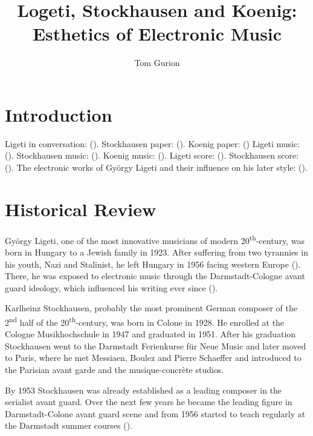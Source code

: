 \documentclass[a4paper,11pt]{article}
\title{Logeti, Stockhausen and Koenig:\\Esthetics of Electronic Music}
\author{Tom Gurion}
\begin{document}
\maketitle
\tableofcontents

\section{Introduction}
\label{sec:introduction}

Ligeti in conversation: (\cite{varnai}).
Stockhausen paper: (\cite{stockhausen}).
Koenig paper: (\cite{koenig})
Ligeti music: (\cite{rami_music}).
Stockhausen music: (\cite{gesang_music}).
Koenig music: (\cite{todo_music}).
Ligeti score: (\cite{rami}).
Stockhausen score: (\cite{gesang}).
The electronic works of Gy{\"o}rgy Ligeti and their influence on his later style: (\cite{levy2006}).

\section{Historical Review}
\label{sec:historical_Review}

Gy{\"o}rgy Ligeti, one of the most innovative musicians of modern 20\textsuperscript{th}-century, was born in Hungary to a Jewish family in 1923.
After suffering from two tyrannies in his youth, Nazi and Stalinist, he left Hungary in 1956 facing western Europe (\cite{ligeti_grove}).
There, he was exposed to electronic music through the Darmstadt-Cologne avant guard ideology, which influenced his writing ever since (\cite[p. TODO]{levy2006}).

Karlheinz Stockhausen, probably the most prominent German composer of the 2\textsuperscript{nd} half of the 20\textsuperscript{th}-century, was born in Colone in 1928.
He enrolled at the Cologne Musikhochschule in 1947 and graduated in 1951.
After his graduation Stockhausen went to the Darmstadt Ferienkurse f{\"u}r Neue Music and later moved to Paris, where he met Messiaen, Boulez and Pierre Schaeffer and introduced to the Parisian avant garde and the musique-concr{\`e}te studios.

By 1953 Stockhausen was already established as a leading composer in the serialist avant guard.
Over the next few years he became the leading figure in Darmstadt-Colone avant guard scene and from 1956 started to teach regularly at the Darmstadt summer courses (\cite{stockhausen_grove}).
\end{document}
